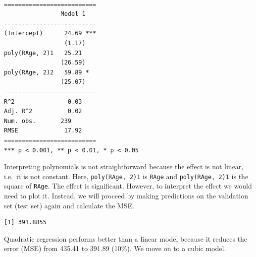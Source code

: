 \documentclass[]{article}
\newenvironment{Shaded}{\begin{snugshade}}{\end{snugshade}}
\newcommand{\CommentTok}[1]{\textcolor[rgb]{0.56,0.35,0.01}{\textit{#1}}}
\newcommand{\DataTypeTok}[1]{\textcolor[rgb]{0.13,0.29,0.53}{#1}}
\newcommand{\DecValTok}[1]{\textcolor[rgb]{0.00,0.00,0.81}{#1}}
\newcommand{\KeywordTok}[1]{\textcolor[rgb]{0.13,0.29,0.53}{\textbf{#1}}}
\newcommand{\NormalTok}[1]{#1}
\newcommand{\OperatorTok}[1]{\textcolor[rgb]{0.81,0.36,0.00}{\textbf{#1}}}
\newcommand{\StringTok}[1]{\textcolor[rgb]{0.31,0.60,0.02}{#1}}
\begin{document}
\begin{verbatim}

==========================
                Model 1   
--------------------------
(Intercept)      24.69 ***
                 (1.17)   
poly(RAge, 2)1   25.21    
                (26.59)   
poly(RAge, 2)2   59.89 *  
                (25.07)   
--------------------------
R^2               0.03    
Adj. R^2          0.02    
Num. obs.       239       
RMSE             17.92    
==========================
*** p < 0.001, ** p < 0.01, * p < 0.05
\end{verbatim}

Interpreting polynomials is not straightforward because the effect is not linear, i.e.~it is not constant. Here, \texttt{poly(RAge,\ 2)1} is \texttt{RAge} and \texttt{poly(RAge,\ 2)1} is the square of \texttt{RAge}. The effect is significant. However, to interpret the effect we would need to plot it. Instead, we will proceed by making predictions on the validation set (test set) again and calculate the MSE.

\begin{Shaded}
\end{Shaded}

\begin{verbatim}
[1] 391.8855
\end{verbatim}

Quadratic regression performs better than a linear model because it reduces the error (MSE) from 435.41 to 391.89 (10\%). We move on to a cubic model.

\begin{Shaded}
\end{Shaded}
\end{document}
